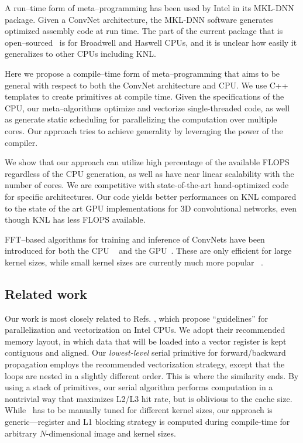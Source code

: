   A run--time form of meta--programming has
  been used by Intel in its MKL-DNN package.  Given a ConvNet
  architecture, the MKL-DNN software generates optimized assembly code
  at run time.  The part of the current package that is
  open--sourced~\cite{idlf,mkl-dnn} is for Broadwell and Haswell CPUs,
  and it is unclear how easily it generalizes to other CPUs including
  KNL.

  Here we propose a compile--time form of meta--programming
  that aims to be general with respect to both the ConvNet
  architecture and CPU.  We use C++ templates to create primitives at
  compile time.  Given the specifications of the CPU, our
  meta--algorithms optimize and vectorize single-threaded code, as
  well as generate static scheduling for parallelizing the computation
  over multiple cores.  Our approach tries to achieve generality by
  leveraging the power of the compiler.


  We show that our approach can utilize high percentage of the
  available FLOPS regardless of the CPU generation, as well as have
  near linear scalability with the number of cores.  We are
  competitive with state-of-the-art hand-optimized code for specific
  architectures.  Our code yields better performances on KNL
  compared to the state of the art GPU implementations for 3D
  convolutional networks, even though KNL has less FLOPS available.

  FFT--based algorithms for training and inference of ConvNets have
  been introduced for both the CPU
  ~\cite{zlateski2016znn,zlateski2016znni} and the
  GPU~\cite{mathieu-iclr-14,vasilache2014fast}.  These are only
  efficient for large kernel sizes, while small kernel sizes are
  currently much more popular
  ~\cite{szegedy2015going,ronneberger2015u, simonyan2014very,
    sermanet2013overfeat, long2015fully, tran2015learning, ji20133d,
    maturana_iros_2015, maturana_icra_2014}.

  \subsection{Related work}

  Our work is most closely related to Refs.
  \cite{chellapilla2006high,das2016distributed}, which propose
  ``guidelines'' for parallelization and vectorization on Intel CPUs.
  We adopt their recommended memory layout, in which data that will be
  loaded into a vector register is kept contiguous and aligned.  Our
  \emph{lowest-level} serial primitive for forward/backward
  propagation employs the recommended vectorization strategy, except
  that the loops are nested in a slightly different order.  This is
  where the similarity ends.  By using a stack of primitives, our
  serial algorithm performs computation in a nontrivial way that
  maximizes L2/L3 hit rate, but is oblivious to the cache size.
  While~\cite{chellapilla2006high} has to be manually tuned for
  different kernel sizes, our approach is generic---register and L1
  blocking strategy is computed during compile-time for arbitrary
  $N$-dimensional image and kernel sizes.


